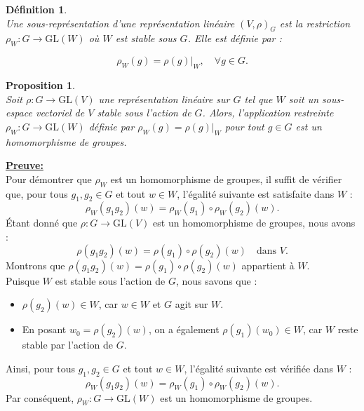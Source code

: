 \documentclass[a4paper, 14pt]{report}
\newtheorem{definition}{Définition}[section]
\newtheorem{proposition}{Proposition}[section]
\begin{document}
\begin{onehalfspace}
{\begin{definition} \cite{serre1971representation}\\
Une sous-représentation d'une représentation linéaire \((V,\rho)_{G} \) est la restriction  \\
\( \rho_W : G \rightarrow \mathrm{GL}(W) \) où \( W \) est stable sous \( G \). Elle est définie par :
	
	\[
	\rho_W(g) = \rho(g)|_W, \quad \forall g \in G.
	\]
	
\end{definition}


\begin{proposition} \cite{serre1971representation} \label{propo0} \\
Soit \( \rho : G \rightarrow \mathrm{GL}(V) \) une représentation linéaire sur \( G \) tel que \( W \) soit un sous-espace vectoriel de \( V \) stable sous l'action de \( G \). Alors, l'application restreinte \( \rho_W : G \rightarrow \mathrm{GL}(W) \) définie par \( \rho_W(g) = \rho(g)|_W \) pour tout \( g \in G \) est un homomorphisme de groupes.	
\end{proposition}


\textbf{\underline{Preuve:}}  \\
Pour démontrer que \( \rho_W \) est un homomorphisme de groupes, il suffit de vérifier que, pour tous \( g_1, g_2 \in G \) et tout \( w \in W \), l'égalité suivante est satisfaite dans \( W \) :  
\[
\rho_W(g_1 g_2)(w) = \rho_W(g_1) \circ \rho_W(g_2)(w).
\]
Étant donné que \( \rho : G \rightarrow \mathrm{GL}(V) \) est un homomorphisme de groupes, nous avons :  
\[
\rho(g_1 g_2)(w) = \rho(g_1) \circ \rho(g_2)(w) \quad \text{dans } V.
\]
Montrons que \( \rho(g_1 g_2)(w) = \rho(g_1) \circ \rho(g_2)(w) \) appartient à \( W \).  \\
Puisque \( W \) est stable sous l'action de \( G \), nous savons que :  
\begin{itemize}
	\item \( \rho(g_2)(w) \in W \), car \( w \in W \) et \( G \) agit sur \( W \).  
	\item En posant \( w_0 = \rho(g_2)(w) \), on a également \( \rho(g_1)(w_0) \in W \), car \( W \) reste stable par l'action de \( G \).  
\end{itemize}
Ainsi, pour tous \( g_1, g_2 \in G \) et tout \( w \in W \), l'égalité suivante est vérifiée dans \( W \) :  
\[
\rho_W(g_1 g_2)(w) = \rho_W(g_1) \circ \rho_W(g_2)(w).
\]  
Par conséquent, \( \rho_W : G \rightarrow \mathrm{GL}(W) \) est un homomorphisme de groupes.

}
\end{onehalfspace}
\end{document}
